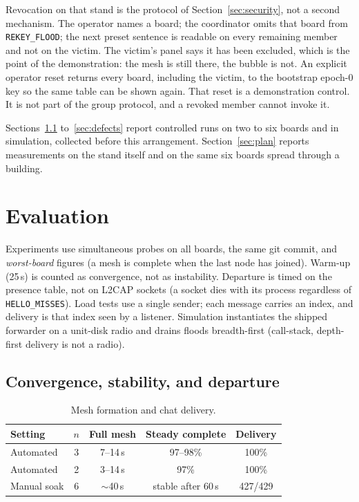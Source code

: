 \documentclass[conference,10pt]{IEEEtran}
\begin{document}
Revocation on that stand is the protocol of Section~\ref{sec:security},
not a second mechanism. The operator names a board; the coordinator
omits that board from \texttt{REKEY\_FLOOD}; the next preset sentence is
readable on every remaining member and not on the victim. The victim's
panel says it has been excluded, which is the point of the demonstration:
the mesh is still there, the bubble is not. An explicit operator reset
returns every board, including the victim, to the bootstrap epoch-0 key
so the same table can be shown again. That reset is a demonstration
control. It is not part of the group protocol, and a revoked member
cannot invoke it.

Sections~\ref{sec:conv} to~\ref{sec:defects} report controlled runs on
two to six boards and in simulation, collected before this arrangement.
Section~\ref{sec:plan} reports measurements on the stand itself and on
the same six boards spread through a building.

\section{Evaluation}
\label{sec:eval}

Experiments use simultaneous probes on all boards, the same git commit,
and \emph{worst-board} figures (a mesh is complete when the last node has
joined). Warm-up (25\,s) is counted as convergence, not as instability.
Departure is timed on the presence table, not on L2CAP sockets (a socket
dies with its process regardless of \texttt{HELLO\_MISSES}). Load tests
use a single sender; each message carries an index, and delivery is that
index seen by a listener. Simulation instantiates the shipped forwarder
on a unit-disk radio and drains floods breadth-first (call-stack,
depth-first delivery is not a radio).

\subsection{Convergence, stability, and departure}
\label{sec:conv}

\begin{table}[t]
\centering
\caption{Mesh formation and chat delivery.}
\label{tab:conv}
\begin{tabular}{@{}lcccc@{}}
\toprule
Setting & $n$ & Full mesh & Steady complete & Delivery \\
\midrule
Automated & 3 & 7--14\,s & 97--98\% & 100\% \\
Automated & 2 & 3--14\,s & 97\% & 100\% \\
Manual soak & 6 & $\sim$40\,s & stable after 60\,s & 427/429 \\
\bottomrule
\end{tabular}
\end{table}
\end{document}
